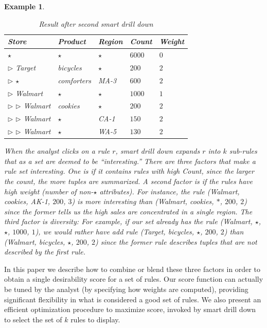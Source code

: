 \documentclass[10pt,journal,compsoc]{IEEEtran}
\newtheorem{example}[definition]{Example}
\begin{document}
\begin{example}
\begin{table}
\vspace{-10pt}
\scriptsize
\centering
\begin{tabular}{| l | l | l | l | l |}
\hline Store & Product & Region & Count & Weight \\
\hline
$\star$ & $\star$ & $\star$ & $6000$ & $0$ \\  \cline{1-5}
$\triangleright$ Target & bicycles & $\star$ & $200$ & $2$ \\ \cline{1-5}
$\triangleright$ $\star$ & comforters & MA-3 & $600$ & $2$ \\ \cline{1-5}
$\triangleright$ Walmart & $\star$ & $\star$ & $1000$ & $1$ \\ \cline{2-5}
$\triangleright$ $\triangleright$ Walmart & cookies & $\star$ & $200$ & $2$ \\ \cline{2-5}
$\triangleright$ $\triangleright$ Walmart & $\star$ & CA-1 & $150$ & $2$ \\ \cline{2-5}
$\triangleright$ $\triangleright$ Walmart & $\star$ & WA-5 & $130$ & $2$ \\ \hline
\end{tabular}
\caption{Result after second smart drill down} \label{table:introexample2}
\vspace{-10pt}
\end{table}

When the analyst clicks on a rule $r$, smart drill down
expands $r$ into $k$ sub-rules that as a set are deemed to be ``interesting.''
There are three factors that make a rule set interesting.
One is if it contains rules with high Count,
since the larger the count, the more tuples are summarized.
A second factor is if the rules have high weight (number of non-$\star$ attributes).
For instance, the rule (Walmart, cookies, AK-1, $200$, $3$)
is more interesting than (Walmart, cookies, $*$, $200$, $2$)
since the former tells us the high sales are concentrated in a single region.
The third factor is diversity: For example, if our set already has the rule (Walmart, $\star$, $\star$, $1000$, $1$), 
we would rather have add rule (Target, bicycles, $\star$, $200$, $2$)
than (Walmart, bicycles, $\star$, $200$, $2$) since the former rule
describes tuples that are not described by the first rule.
\end{example}

In this paper we describe how to combine or blend these three factors
in order to obtain a single desirability score for a set of rules.
Our score function can actually be tuned by the analyst
(by specifying how weights are computed),
providing significant flexibility in what is considered a good set of rules.
We also present an efficient optimization procedure to maximize score, invoked
by smart drill down to select the set of $k$ rules to display.
\end{document}
